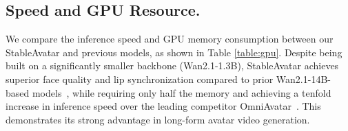 \begin{table}[t!]\small
\caption{Comparisons in inference latency and GPU resources. Inference latency (minutes) and GPU memory are measured for generating 81 frames at 480×832 resolution.
}
\vspace{-0.25in}
\begin{center}
\renewcommand\arraystretch{1.1}
\end{center}
\label{table:gpu}
\vspace{-0.3in}
\end{table}

\subsection{Speed and GPU Resource.}
\label{supp:gpu}
We compare the inference speed and GPU memory consumption between our StableAvatar and previous models, as shown in Table \ref{table:gpu}.
Despite being built on a significantly smaller backbone (Wan2.1-1.3B), StableAvatar achieves superior face quality and lip synchronization compared to prior Wan2.1-14B-based models~\cite{wang2025fantasytalking,kong2025let,gan2025omniavatar}, while requiring only half the memory and achieving a tenfold increase in inference speed over the leading competitor OmniAvatar~\cite{gan2025omniavatar}. This demonstrates its strong advantage in long-form avatar video generation.

